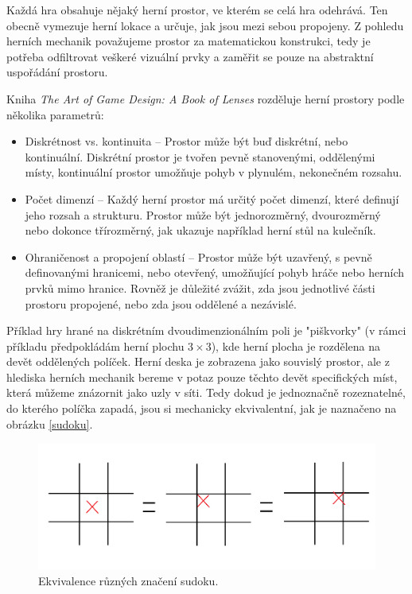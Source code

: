 Každá hra obsahuje nějaký herní prostor, ve kterém se celá hra odehrává. Ten obecně vymezuje herní lokace a určuje, jak jsou mezi sebou propojeny. Z pohledu herních mechanik považujeme prostor za matematickou konstrukci, tedy je potřeba odfiltrovat veškeré vizuální prvky a zaměřit se pouze na abstraktní uspořádání prostoru.

Kniha \textit{The Art of Game Design: A Book of Lenses} rozděluje herní prostory podle několika parametrů:

\begin{itemize}
    \item Diskrétnost vs. kontinuita -- Prostor může být buď diskrétní, nebo kontinuální. Diskrétní prostor je tvořen pevně stanovenými, oddělenými místy, kontinuální prostor umožňuje pohyb v plynulém, nekonečném rozsahu.
    \item Počet dimenzí -- Každý herní prostor má určitý počet dimenzí, které definují jeho rozsah a strukturu. Prostor může být jednorozměrný, dvourozměrný nebo dokonce třírozměrný, jak ukazuje například herní stůl na kulečník.
    \item Ohraničenost a propojení oblastí -- Prostor může být uzavřený, s pevně definovanými hranicemi, nebo otevřený, umožňující pohyb hráče nebo herních prvků mimo hranice. Rovněž je důležité zvážit, zda jsou jednotlivé části prostoru propojené, nebo zda jsou oddělené a nezávislé.
\end{itemize}

Příklad hry hrané na diskrétním dvoudimenzionálním poli je "piškvorky" (v rámci příkladu předpokládám herní plochu $3\times3$), kde herní plocha je rozdělena na devět oddělených políček. Herní deska je zobrazena jako souvislý prostor, ale z hlediska herních mechanik bereme v potaz pouze těchto devět specifických míst, která můžeme znázornit jako uzly v síti. Tedy dokud je jednoznačně rozeznatelné, do kterého políčka zapadá, jsou si mechanicky ekvivalentní, jak je naznačeno na obrázku \vref{sudoku}.

\begin{figure}
  \centering      %
  \includegraphics[scale=0.3]{obr/sudoku.png} %
  \caption{Ekvivalence různých značení sudoku.} %
  \label{sudoku} %
\end{figure}

